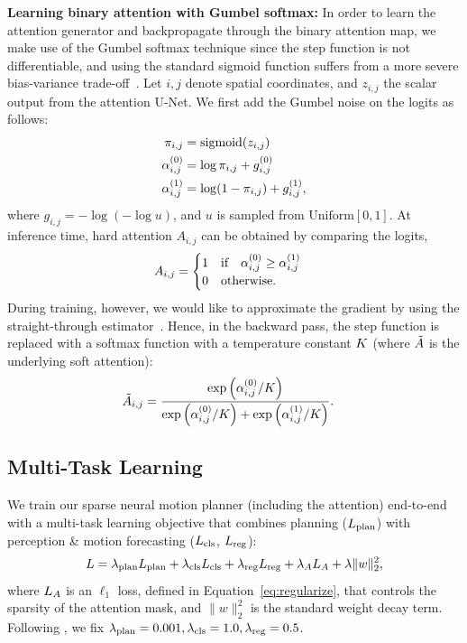 \textbf{Learning binary attention with Gumbel softmax:}
In order to learn the attention generator and backpropagate through the binary attention map, we make use of the Gumbel
softmax technique \cite{gumbel,concrete} since the step function is not differentiable, and using
the standard sigmoid function suffers from a more severe bias-variance trade-off~\cite{gumbel}. Let
$i,j$ denote spatial coordinates, and $z_{i,j}$ the scalar output from the attention U-Net. We first
add the Gumbel noise on the logits as follows:
\vskip -0.15in
\begin{align}
  \pi_{i,j} &= \operatorname*{\mathrm{sigmoid}}(z_{i,j}) \\
  \alpha_{i,j}^{(0)} &= \log \pi_{i,j} + g_{i,j}^{(0)}\\
  \alpha_{i,j}^{(1)} &= \log (1 - \pi_{i,j}) + g_{i,j}^{(1)},
\end{align}
where $g_{i,j} = -\log(-\log u)$, and $u$ is sampled from $\textrm{Uniform}[0,1]$. At inference time,
hard attention $A_{i,j}$ can be obtained by comparing the logits,
\begin{align}
A_{i,j} &= \begin{cases}
1 & \text{if} \ \ \ \alpha_{i,j}^{(0)} \ge \alpha_{i,j}^{(1)} \\
0 & \text{otherwise}.
\end{cases}
\end{align}
During training, however, we would like to approximate the gradient by using the straight-through
estimator~\cite{gumbel,ste}. Hence, in the backward pass, the step function is replaced with a
softmax function with a temperature constant $K$ (where $\tilde{A}$ is the underlying soft attention):
\begin{align}
\tilde{A}_{i,j} &= \frac{\exp \left( \alpha_{i,j}^{(0)}/K \right)}
  {\exp\left(\alpha_{i,j}^{(0)} / K \right)
   + \exp\left(\alpha_{i,j}^{(1)} / K \right)}.
\end{align}

\subsection{Multi-Task Learning}
\label{sec:loss}
We train our sparse  neural motion planner (including the attention) end-to-end with a multi-task learning
objective that combines planning ($L_{\text{plan}}$) with perception \& motion forecasting ($L_{\text{cls}}$, $L_{\text{reg}}$):
\begin{align}
L = \lambda_{\text{plan}} L_{\text{plan}} + \lambda_{\text{cls}} L_{\text{cls}} + \lambda_{\text{reg}} L_{\text{reg}} + \lambda_{A} L_{A} + \lambda \lVert w \rVert^2_2,
\label{eq:joint}
\end{align}
where $L_{A}$ is an $\ell_1$ loss, defined in Equation~\ref{eq:regularize}, that controls the sparsity of the attention mask, and $\lVert w
\rVert^2_2$ is the standard weight decay term. Following \cite{nmp, pnpnet}, we fix $\lambda_{\text{plan}}=0.001, \lambda_{\text{cls}}=1.0,
\lambda_{\text{reg}}=0.5$.


